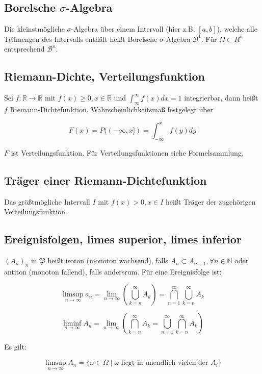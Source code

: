 \documentclass{scrartcl}%
\begin{document}
\subsection{Borelsche $\sigma$-Algebra}
Die kleinstmögliche $\sigma$-Algebra über einem Intervall (hier z.B. $[a,b]$), welche alle Teilmengen des Intervalls enthält heißt Borelsche $\sigma$-Algebra $\mathcal{B}^1$. Für $\Omega \subset R^n$ entsprechend $\mathcal{B}^n$.

\subsection{Riemann-Dichte, Verteilungsfunktion}
Sei $f: \mathbb{R} \rightarrow \mathbb{R}$ mit $f(x) \geq 0, x \in \mathbb{R}$ und $\int_{\infty}^{\infty} f(x) dx = 1$ integrierbar, dann heißt $f$ Riemann-Dichtefunktion. Wahrscheinlichkeitsmaß festgelegt über

\[F(x) = P((-\infty,x]) = \int_{-\infty}^{x} f(y) dy\]

$F$ ist Verteilungsfunktion. Für Verteilungsfunktionen siehe Formelsammlung.

\subsection{Träger einer Riemann-Dichtefunktion}
Das größtmögliche Intervall $I$ mit $f(x) > 0, x \in I$ heißt Träger der zugehörigen Verteilungsfunktion.

\subsection{Ereignisfolgen, limes superior, limes inferior}

$(A_n)_n$ in $\mathfrak{P}$ heißt isoton (monoton wachsend), falls $A_n \subset A_{n+1}, \forall n \in \mathbb{N}$ oder antiton (monoton fallend), falls andersrum. Für eine Ereignisfolge ist:

\[\limsup\limits_{n \rightarrow \infty}{a_n} = \lim\limits_{n \rightarrow \infty} (\bigcup\limits_{k=n}^{\infty} A_k) = \bigcap\limits_{n=1}^{\infty} \bigcup\limits_{k=n}^{\infty} A_k\]

\[\liminf\limits_{n \rightarrow \infty} A_n = \lim\limits_{n \rightarrow \infty} (\bigcap\limits_{k=n}^\infty A_k = \bigcup\limits_{n=1}^\infty \bigcap\limits_{k=n}^\infty A_k)\]

Es gilt: 


\[\limsup\limits_{n \rightarrow \infty} A_n = \{\omega \in \Omega \mid \omega \textrm{ liegt in unendlich vielen der } A_i\} \]
\end{document}
